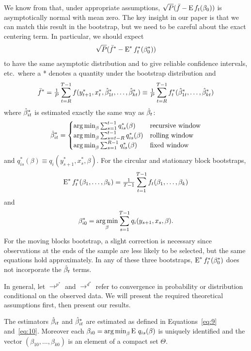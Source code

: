 \documentclass[12pt,fleqn]{article}
\begin{document}
We know from \citet{Wes:96} that, under appropriate assumptions,
$\sqrt{P} (\bar f - \operatorname{E} f_t(\beta_0))$ is asymptotically normal with mean
zero. The key insight in our paper is that we can match this result in
the bootstrap, but we need to be careful about the exact centering
term.  In particular, we should expect
\begin{equation*}
  \sqrt{P} (\bar f^* - \operatorname{E}^* f_t^*(\beta_0^*))
\end{equation*}
to have the same asymptotic distribution and to give reliable
confidence intervals, etc.\ where a * denotes a quantity under the
bootstrap distribution and
\begin{equation}
  \bar f^* = \tfrac{1}{P} \sum_{t=R}^{T-1} f(y_{t+1}^*, x_t^*, \hat \beta_{1t}^*,\dots,\hat \beta_{kt}^*)
  \equiv \tfrac{1}{P} \sum_{t=R}^{T-1} f_t^*(\hat \beta_{1t}^*,\dots,\hat \beta_{kt}^*)
\end{equation}
where $\hat \beta_{it}^*$ is estimated exactly the same way as $\hat \beta_t$:
\begin{equation}\label{eq:10}
  \hat\beta_{it}^* = \begin{cases}
    \operatorname*{arg\,min}_\beta \sum_{s=1}^{t-1} q_{is}^*(\beta) & \text{recursive window} \\
    \operatorname*{arg\,min}_\beta \sum_{s=t-R}^{t-1} q_{is}^*(\beta) & \text{rolling window} \\
    \operatorname*{arg\,min}_\beta \sum_{s=1}^{R-1} q_{is}^*(\beta) & \text{fixed window}
  \end{cases}
\end{equation}
and $q_{is}^*(\beta) \equiv q_i(y_{s+1}^*, x_s^*, \beta)$.
For the circular and stationary block bootstraps,
\begin{equation*}
  \operatorname{E}^* f_t^*(\beta_1,\dots,\beta_k) = \tfrac{1}{T-1} \sum_{t=1}^{T-1} f_t(\beta_1,\dots,\beta_k)
\end{equation*}
and
\begin{equation*}
  \beta_{i0}^* = \operatorname*{arg\,min}_\beta \sum_{s=1}^{T-1} q_i(y_{s+1}, x_s, \beta).
\end{equation*}
For the moving blocks bootstrap, a slight correction is necessary
since observations at the ends of the sample are less likely to be
selected, but the same equations hold approximately. In any of these
three bootstraps, $\operatorname{E}^* f_t^*(\beta_0^*)$ does not incorporate the
$\hat \beta_t$ terms.

In general, let $\to^{p^{*}}$ and $\to^{d^{*}}$ refer to convergence
in probability or distribution conditional on the observed data.
We will present the required theoretical assumptions first, then
present our results.

\begin{asmp}\label{a1}
  The estimators $\hat \beta_{it}$ and $\hat \beta_{it}^*$ are estimated as defined in
  Equations~\eqref{eq:9} and~\eqref{eq:10}. Moreover each $\beta_{i0} =
  \operatorname*{arg\,min}_\beta \operatorname{E}\, q_{is}(\beta)$ is uniquely identified and the vector
  $(\beta_{10},\dots,\beta_{k0})$ is an element of a compact set $\Theta$.
\end{asmp}
\end{document}
